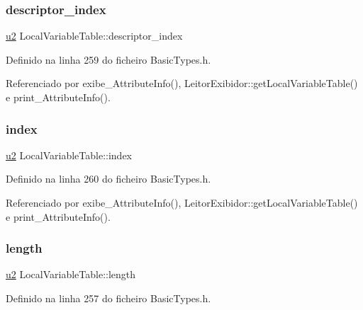 \subsubsection{\texorpdfstring{descriptor\+\_\+index}{descriptor\_index}}
{\footnotesize\ttfamily \hyperlink{BasicTypes_8h_a732cde1300aafb73b0ea6c2558a7a54f}{u2} Local\+Variable\+Table\+::descriptor\+\_\+index}



Definido na linha 259 do ficheiro Basic\+Types.\+h.



Referenciado por exibe\+\_\+\+Attribute\+Info(), Leitor\+Exibidor\+::get\+Local\+Variable\+Table() e print\+\_\+\+Attribute\+Info().

\mbox{\label{structLocalVariableTable_ab50a3227c68569b6a040306b1f7ebfd1}} 
\subsubsection{\texorpdfstring{index}{index}}
{\footnotesize\ttfamily \hyperlink{BasicTypes_8h_a732cde1300aafb73b0ea6c2558a7a54f}{u2} Local\+Variable\+Table\+::index}



Definido na linha 260 do ficheiro Basic\+Types.\+h.



Referenciado por exibe\+\_\+\+Attribute\+Info(), Leitor\+Exibidor\+::get\+Local\+Variable\+Table() e print\+\_\+\+Attribute\+Info().

\mbox{\label{structLocalVariableTable_a0027db27baa11c80536bc1042490709f}} 
\subsubsection{\texorpdfstring{length}{length}}
{\footnotesize\ttfamily \hyperlink{BasicTypes_8h_a732cde1300aafb73b0ea6c2558a7a54f}{u2} Local\+Variable\+Table\+::length}



Definido na linha 257 do ficheiro Basic\+Types.\+h.



